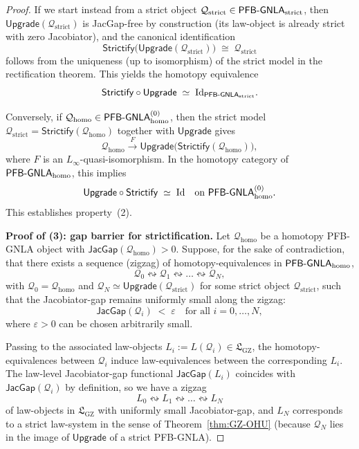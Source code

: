 \documentclass[11pt]{book}
\theoremstyle{plain}
\theoremstyle{definition}
\newcommand{\GZLS}{\ensuremath{\mathfrak{L}_{\mathrm{GZ}}}}       \newcommand{\GZLT}{\ensuremath{M_{!w}}}                           \newcommand{\GZLOC}{\ensuremath{A_M}}                             \newcommand{\GZLCurv}{\ensuremath{\mathcal{F}_{\mathrm{law}}}}
\begin{document}
\begin{proof}
If we start instead from a strict object
\(\mathcal{Q}_{\mathrm{strict}}\in
 \mathsf{PFB\text- GNLA}_{\mathrm{strict}}\),
then \(\mathsf{Upgrade}(\mathcal{Q}_{\mathrm{strict}})\) is
JacGap-free by construction (its law-object is already strict with zero
Jacobiator), and the canonical identification
\[
  \mathsf{Strictify}\bigl(\mathsf{Upgrade}(\mathcal{Q}_{\mathrm{strict}})\bigr)
  \;\cong\;
  \mathcal{Q}_{\mathrm{strict}}
\]
follows from the uniqueness (up to isomorphism) of the strict model in
the rectification theorem.  This yields the homotopy equivalence
\[
  \mathsf{Strictify}\circ\mathsf{Upgrade}
  \;\simeq\;
  \mathrm{Id}_{\mathsf{PFB\text- GNLA}_{\mathrm{strict}}}.
\]

Conversely, if \(\mathcal{Q}_{\mathrm{homo}}\in
\mathsf{PFB\text- GNLA}_{\mathrm{homo}}^{(0)}\), then the strict model
\(\mathcal{Q}_{\mathrm{strict}}=
\mathsf{Strictify}(\mathcal{Q}_{\mathrm{homo}})\) together with
\(\mathsf{Upgrade}\) gives
\[
  \mathcal{Q}_{\mathrm{homo}}
  \xrightarrow{\;F\;}
  \mathsf{Upgrade}\bigl(\mathsf{Strictify}(\mathcal{Q}_{\mathrm{homo}})\bigr),
\]
where \(F\) is an \(L_\infty\)-quasi-isomorphism.  In the homotopy
category of \(\mathsf{PFB\text- GNLA}_{\mathrm{homo}}\), this implies
\[
  \mathsf{Upgrade}\circ\mathsf{Strictify}
  \;\simeq\;
  \mathrm{Id}\quad
  \text{on }\mathsf{PFB\text- GNLA}_{\mathrm{homo}}^{(0)}.
\]
This establishes property~\textnormal{(2)}.



\medskip\noindent
\textbf{Proof of (3): gap barrier for strictification.}
Let \(\mathcal{Q}_{\mathrm{homo}}\) be a homotopy PFB-GNLA object with
\(\mathsf{JacGap}(\mathcal{Q}_{\mathrm{homo}})>0\).  Suppose, for the
sake of contradiction, that there exists a sequence (zigzag) of
homotopy-equivalences in \(\mathsf{PFB\text- GNLA}_{\mathrm{homo}}\),
\[
  \mathcal{Q}_0
  \leftrightsquigarrow
  \mathcal{Q}_1
  \leftrightsquigarrow
  \dots
  \leftrightsquigarrow
  \mathcal{Q}_N,
\]
with \(\mathcal{Q}_0=\mathcal{Q}_{\mathrm{homo}}\) and
\(\mathcal{Q}_N\simeq\mathsf{Upgrade}(\mathcal{Q}_{\mathrm{strict}})\)
for some strict object \(\mathcal{Q}_{\mathrm{strict}}\), such that the
Jacobiator-gap remains uniformly small along the zigzag:
\[
  \mathsf{JacGap}(\mathcal{Q}_i)
  \;<\;
  \varepsilon
  \quad\text{for all } i=0,\dots,N,
\]
where \(\varepsilon>0\) can be chosen arbitrarily small.

Passing to the associated law-objects \(L_i:=L(\mathcal{Q}_i)\in\GZLS\),
the homotopy-equivalences between \(\mathcal{Q}_i\) induce
law-equivalences between the corresponding \(L_i\).  The law-level
Jacobiator-gap functional \(\mathsf{JacGap}(L_i)\) coincides with
\(\mathsf{JacGap}(\mathcal{Q}_i)\) by definition, so we have a zigzag
\[
  L_0 \leftrightsquigarrow L_1 \leftrightsquigarrow \dots
  \leftrightsquigarrow L_N
\]
of law-objects in \(\GZLS\) with uniformly small Jacobiator-gap, and
\(L_N\) corresponds to a strict law-system in the sense of
Theorem~\ref{thm:GZ-OHU} (because \(\mathcal{Q}_N\) lies in the image
of \(\mathsf{Upgrade}\) of a strict PFB-GNLA).


\end{proof}
\end{document}
